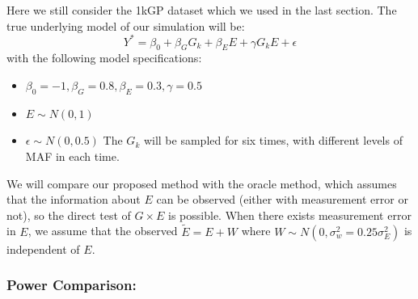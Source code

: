 \documentclass[
]{article}
\providecommand{\tightlist}{%
  \setlength{\itemsep}{0pt}\setlength{\parskip}{0pt}}
\begin{document}
Here we still consider the 1kGP dataset which we used in the last
section. The true underlying model of our simulation will be:
\[Y^* = \beta_0 + \beta_GG_k + \beta_EE+\gamma G_kE + \epsilon\] with
the following model specifications:

\begin{itemize}
\tightlist
\item
  \(\beta_0= -1, \beta_G=0.8, \beta_E= 0.3,\gamma=0.5\)
\item
  \(E \sim N(0,1)\)
\item
  \(\epsilon \sim N(0,0.5)\) The \(G_k\) will be sampled for six times,
  with different levels of MAF in each time.
\end{itemize}

We will compare our proposed method with the oracle method, which
assumes that the information about \(E\) can be observed (either with
measurement error or not), so the direct test of \(G\times E\) is
possible. When there exists measurement error in \(E\), we assume that
the observed \(\tilde{E}=E+W\) where
\(W \sim N(0,\sigma_w^2 = 0.25\sigma_E^2)\) is independent of \(E\).

\hypertarget{power-comparison}{%
\subsubsection{Power Comparison:}\label{power-comparison}}
\end{document}
